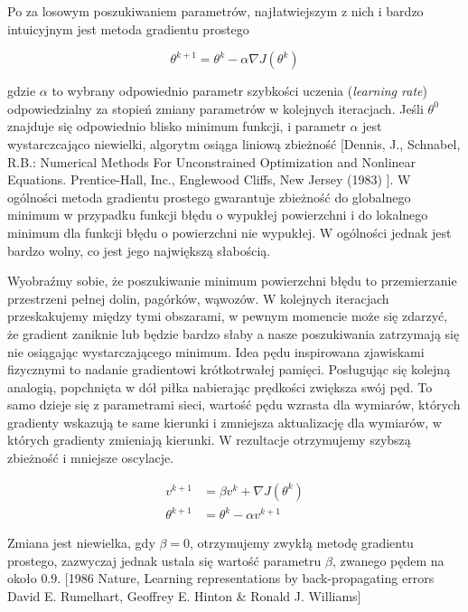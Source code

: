 \documentclass[]{article}
\theoremstyle{definition}
\begin{document}
Po za losowym poszukiwaniem parametrów, najłatwiejszym z nich i bardzo intuicyjnym jest metoda gradientu prostego


\begin{equation}
\theta^{k+1} = \theta^{k} - \alpha \nabla J(\theta^{k})
\end{equation}


gdzie $\alpha$ to wybrany odpowiednio parametr szybkości uczenia (\textit{learning rate}) odpowiedzialny za stopień zmiany parametrów w kolejnych iteracjach. Jeśli $\theta^0$ znajduje się odpowiednio blisko minimum funkcji, i parametr $\alpha$ jest wystarczcająco niewielki, algorytm osiąga liniową zbieżność [Dennis, J., Schnabel, R.B.: Numerical Methods For Unconstrained Optimization and Nonlinear Equations. Prentice-Hall, Inc., Englewood Cliffs, New Jersey (1983)
]. W ogólności metoda gradientu prostego gwarantuje zbieżność do globalnego minimum w przypadku funkcji błędu o wypukłej powierzchni i do lokalnego minimum dla funkcji błędu o powierzchni nie wypukłej. W ogólności jednak jest bardzo wolny, co jest jego największą słabością.

Wyobraźmy sobie, że poszukiwanie minimum powierzchni błędu to przemierzanie przestrzeni pełnej dolin, pagórków, wąwozów. W kolejnych iteracjach przeskakujemy między tymi obszarami, w pewnym momencie może się zdarzyć, że gradient zaniknie lub będzie bardzo słaby a nasze poszukiwania zatrzymają się nie osiągając wystarczającego minimum. Idea pędu inspirowana zjawiskami fizycznymi to nadanie gradientowi krótkotrwałej pamięci. Posługując się kolejną analogią, popchnięta w dół piłka nabierając prędkości zwiększa swój pęd. To samo dzieje się z parametrami sieci, wartość pędu wzrasta dla wymiarów, których gradienty wskazują te same kierunki i zmniejsza aktualizację dla wymiarów, w których gradienty zmieniają kierunki. W rezultacje otrzymujemy szybszą zbieżność i mniejsze oscylacje.

\begin{align} 
v^{k+1} &=  \beta v^{k}+ \nabla J(\theta^{k}) \\[0.4em]
\theta^{k+1} &=  \theta^{k }- \alpha v^{k+1}
\end{align}

Zmiana jest niewielka, gdy $\beta = 0$, otrzymujemy zwykłą metodę gradientu prostego, zazwyczaj jednak ustala się wartość parametru $\beta$, zwanego pędem na około $0.9$. [1986 Nature, Learning representations by back-propagating errors
David E. Rumelhart, Geoffrey E. Hinton \& Ronald J. Williams]
\end{document}
